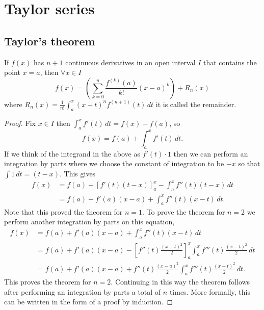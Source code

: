 \documentclass[10pt, a4paper]{article}
\begin{document}
\section{Taylor series}

\subsection{Taylor's theorem}

\begin{theorem}
    If $f(x)$ has $n + 1$ continuous derivatives in an open interval $I$ that contains the point $x = a$,
    then $\forall x \in I$
    \[
    f(x) = \left(\sum_{k = 0}^{n}\frac{f ^ {(k)}(a)}{k!}(x - a) ^ k\right) + R_n(x)
    \]
    where $\displaystyle R_n(x) = \frac{1}{n!}\int_{a}^{x}(x - t) ^ nf ^ {(n + 1)}(t)\,dt$ it is called the remainder.
    \begin{proof}
        Fix $x \in I$ then $\int_{a}^{x}f'(t)\,dt = f(x) - f(a)$,
        so
        \[
        f(x) = f(a) + \int_{a}^{x}f'(t)\,dt.
        \]
        If we think of the integrand in the above as $f'(t) \cdot 1$ then we can perform an integration by parts where we choose the constant of integration to be $-x$ so that $\int 1\,dt = (t - x)$.
        This gives
        \begin{align*}
            f(x) &= f(a) + \left[f'(t)(t - x)\right]_{a}^{x} - \int_{a}^{x}f''(t)(t - x)\,dt \\
            &= f(a) + f'(a)(x - a) + \int_{a}^{x}f''(t)(x - t)\,dt.
        \end{align*}
        Note that this proved the theorem for $n = 1$.
        To prove the theorem for $n = 2$ we perform another integration by parts on this equation,
        \begin{align*}
            f(x) &= f(a) + f'(a)(x - a) + \int_{a}^{x}f''(t)(x - t)\,dt \\
            &= f(a) + f'(a)(x - a) - \left[f''(t)\frac{(x - t) ^ 2}{2}\right]_{a}^{x} \int_{a}^{x}f'''(t)\frac{(x - t) ^ 2}{2}\,dt \\
            &= f(a) + f'(a)(x - a) + f''(t)\frac{(x - a) ^ 2}{2} \int_{a}^{x}f'''(t)\frac{(x - t) ^ 2}{2}\,dt.
        \end{align*}
        This proves the theorem for $n = 2$.
        Continuing in this way the theorem follows after performing an integration by parts a total of $n$ times.
        More formally,
        this can be written in the form of a proof by induction.
    \end{proof}
\end{theorem}
\end{document}
